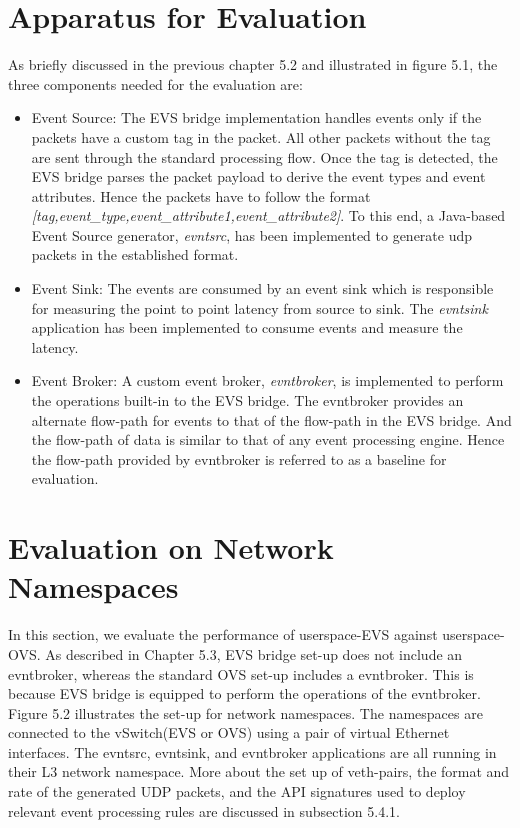 \section{Apparatus for Evaluation}
As briefly discussed in the previous chapter 5.2 and illustrated in figure 5.1, the three components needed for the evaluation are:
\begin{itemize}
 \item Event Source: The EVS bridge implementation handles events only if the packets have a custom tag in the packet. All other packets without the tag are sent through the standard processing flow. Once the tag is detected, the EVS bridge parses the packet payload to derive the event types and event attributes. Hence the packets have to follow the  format \textit{[tag,event_type,event_attribute1,event_attribute2]}. To this end, a Java-based Event Source generator, \textit{evntsrc}, has been implemented to generate \ac{udp} packets in the established format.
  
 \item Event Sink: The events are consumed by an event sink which is responsible for measuring the point to point latency from source to sink. The \textit{evntsink} application has been implemented to consume events and measure the latency.
 
 \item Event Broker: A custom event broker, \textit{evntbroker}, is implemented to perform the operations built-in to the EVS bridge. The evntbroker provides an alternate flow-path for events to that of the flow-path in the EVS bridge. And the flow-path of data is similar to that of any event processing engine. Hence the flow-path provided by evntbroker is referred to as a baseline for evaluation.
\end{itemize}

\section{Evaluation on Network Namespaces}
In this section, we evaluate the performance of userspace-EVS against userspace-OVS. As described in Chapter 5.3, EVS bridge set-up does not include an evntbroker, whereas the standard OVS set-up includes a evntbroker. This is because EVS bridge is equipped to perform the operations of the evntbroker. Figure 5.2 illustrates the set-up for network namespaces. The namespaces are connected to the vSwitch(EVS or OVS) using a pair of virtual Ethernet interfaces. The evntsrc, evntsink, and evntbroker applications are all running in their L3 network namespace. More about the set up of veth-pairs, the format and rate of the generated UDP packets, and the API signatures used to deploy relevant event processing rules are discussed in subsection 5.4.1.

